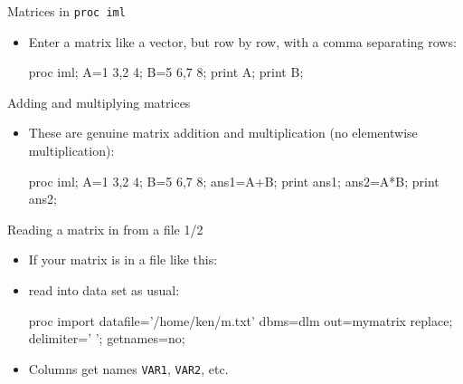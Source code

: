 \documentclass[unknownkeysallowed]{beamer}\usepackage[]{graphicx}\usepackage[]{color}
\begin{document}
\begin{frame}[fragile]{Matrices in \texttt{proc iml}}
  
  \begin{itemize}
  \item Enter a matrix like a vector, but row by row, with a comma
    separating rows:
    
    \begin{Sascode}[store=imea]
proc iml;
  A={1 3,2 4};
  B={5 6,7 8};
  print A;
  print B;
    \end{Sascode}
    
  \end{itemize}
  
\end{frame}

\begin{frame}[fragile]{Adding and multiplying matrices}
  
  \begin{itemize}
  \item These are genuine matrix addition and multiplication (no
    elementwise multiplication):
    
    \begin{Sascode}[store=ime]
proc iml;
  A={1 3,2 4};
  B={5 6,7 8};
  ans1=A+B; 
  print ans1;
  ans2=A*B;
  print ans2;
    \end{Sascode}
    
    
  \end{itemize}
  
\end{frame}

\begin{frame}[fragile]{Reading a matrix in from a file 1/2}
  
  \begin{itemize}
  \item If your matrix is in a file like this:
    

\item read into data set as usual:
  
    \begin{Datastep}
proc import
  datafile='/home/ken/m.txt'
    dbms=dlm
    out=mymatrix
    replace;
  delimiter=' ';
  getnames=no; 
    \end{Datastep}
    
  \item Columns get names \texttt{VAR1}, \texttt{VAR2}, etc.
    
  \end{itemize}
  
\end{frame}
\end{document}
